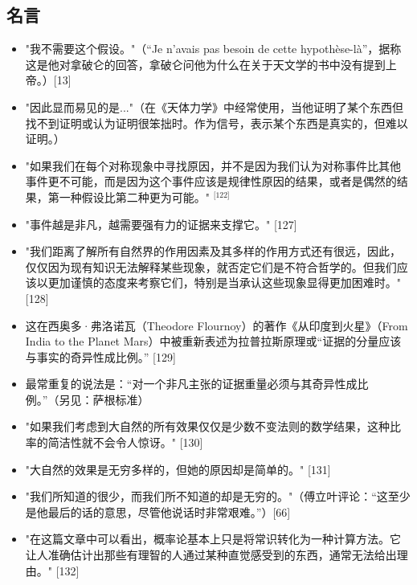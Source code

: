\subsection{名言}  
\begin{itemize}
\item "我不需要这个假设。"（“Je n'avais pas besoin de cette hypothèse-là”，据称这是他对拿破仑的回答，拿破仑问他为什么在关于天文学的书中没有提到上帝。）[13]  
\item "因此显而易见的是..."（在《天体力学》中经常使用，当他证明了某个东西但找不到证明或认为证明很笨拙时。作为信号，表示某个东西是真实的，但难以证明。）  
\item "如果我们在每个对称现象中寻找原因，并不是因为我们认为对称事件比其他事件更不可能，而是因为这个事件应该是规律性原因的结果，或者是偶然的结果，第一种假设比第二种更为可能。" \(^\text{[122]}\)
\item "事件越是非凡，越需要强有力的证据来支撑它。" [127]  
\item "我们距离了解所有自然界的作用因素及其多样的作用方式还有很远，因此，仅仅因为现有知识无法解释某些现象，就否定它们是不符合哲学的。但我们应该以更加谨慎的态度来考察它们，特别是当承认这些现象显得更加困难时。" [128]  
\item 这在西奥多·弗洛诺瓦（Theodore Flournoy）的著作《从印度到火星》（From India to the Planet Mars）中被重新表述为拉普拉斯原理或“证据的分量应该与事实的奇异性成比例。” [129]  
\item 最常重复的说法是：“对一个非凡主张的证据重量必须与其奇异性成比例。”（另见：萨根标准）  
\item "如果我们考虑到大自然的所有效果仅仅是少数不变法则的数学结果，这种比率的简洁性就不会令人惊讶。" [130]  
\item "大自然的效果是无穷多样的，但她的原因却是简单的。" [131]  
\item "我们所知道的很少，而我们所不知道的却是无穷的。"（傅立叶评论：“这至少是他最后的话的意思，尽管他说话时非常艰难。”）[66]  
\item "在这篇文章中可以看出，概率论基本上只是将常识转化为一种计算方法。它让人准确估计出那些有理智的人通过某种直觉感受到的东西，通常无法给出理由。" [132]
\end{itemize}
